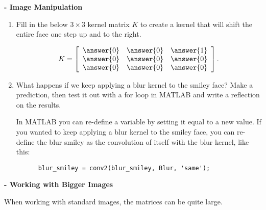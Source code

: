 \documentclass{ximera}
\begin{document}
\begin{problem}
{\bf - Image Manipulation}
\begin{enumerate}
  \item Fill in the below $3\times 3$ kernel matrix $K$ to create a kernel that will shift the entire face one step up and to the right.


  $$K=\startmat{ccc}
  \answer{0} & \answer{0} & \answer{1}\\
  \answer{0} & \answer{0} & \answer{0}\\
  \answer{0} & \answer{0} & \answer{0}
  \stopmat.$$
  
  \item What happens if we keep applying a blur kernel to the smiley face? Make a prediction, then test it out with a for loop in MATLAB and write a reflection on the results.
  
  \begin{hint}

    In MATLAB you can re-define a variable by setting it equal to a new value. If you wanted to keep applying a blur kernel to the smiley face, you can re-define the blur smiley as the convolution of itself with the blur kernel, like this:
    \begin{verbatim}
      blur_smiley = conv2(blur_smiley, Blur, 'same');
    \end{verbatim}

  \end{hint}

\end{enumerate}

\end{problem}

\begin{problem}
{\bf - Working with Bigger Images}

When working with standard images, the matrices can be quite large. 


\end{problem}
\end{document}
